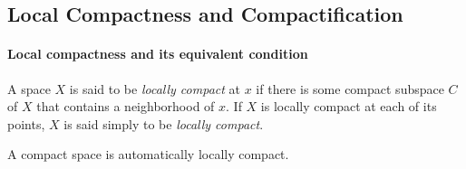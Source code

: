 \subsection{Local Compactness and Compactification}

\paragraph{Local compactness and its equivalent condition}

\begin{definition}
  A space \( X \) is said to be \emph{locally compact} at \( x \) if there is some compact subspace \( C \) of \( X \) that contains a neighborhood of \( x \).
  If \( X \) is locally compact at each of its points, \( X \) is said simply to be \emph{locally compact}.
\end{definition}
\begin{remark}
  A compact space is automatically locally compact.
\end{remark}

